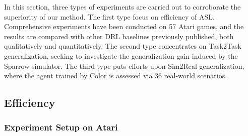 \documentclass[journal]{IEEEtran}
\begin{document}
In this section, three types of experiments are carried out to corroborate the superiority of our method. The first type focus on efficiency of ASL. Comprehensive experiments have been conducted on 57 Atari games\cite{atari}, and the results are compared with other DRL baselines previously published, both qualitatively and quantitatively. The second type concentrates on Task2Task generalization, seeking to investigate the generalization gain induced by the Sparrow simulator. The third type puts efforts upon Sim2Real generalization, where the agent trained by Color is assessed via 36 real-world scenarios. 


\subsection{Efficiency}
\subsubsection{Experiment Setup on Atari}
\end{document}
